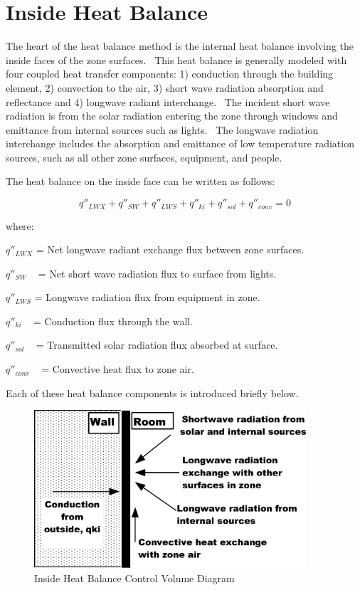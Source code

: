 \section{Inside Heat Balance}\label{inside-heat-balance}

The heart of the heat balance method is the internal heat balance involving the inside faces of the zone surfaces.~ This heat balance is generally modeled with four coupled heat transfer components: 1) conduction through the building element, 2) convection to the air, 3) short wave radiation absorption and reflectance and 4) longwave radiant interchange.~ The incident short wave radiation is from the solar radiation entering the zone through windows and emittance from internal sources such as lights.~ The longwave radiation interchange includes the absorption and emittance of low temperature radiation sources, such as all other zone surfaces, equipment, and people.

The heat balance on the inside face can be written as follows:

\begin{equation}
{q''_{LWX}} + {q''_{SW}} + {q''_{LWS}} + {q''_{ki}} + {q''_{sol}} + {q''_{conv}} = 0
\end{equation}

where:

\({q''_{LWX}}\) = Net longwave radiant exchange flux between zone surfaces.

\({q''_{SW}}\) ~ = Net short wave radiation flux to surface from lights.

\({q''_{LWS}}\) = Longwave radiation flux from equipment in zone.

\({q''_{ki}}\) ~ = Conduction flux through the wall.

\({q''_{sol}}\) ~ = Transmitted solar radiation flux absorbed at surface.

\({q''_{conv}}\) ~ = Convective heat flux to zone air.

Each of these heat balance components is introduced briefly below.

\begin{figure}[hbtp] %
\centering
\includegraphics[width=0.9\textwidth, height=0.9\textheight, keepaspectratio=true]{media/image301.png}
\caption{Inside Heat Balance Control Volume Diagram \protect \label{fig:inside-heat-balance-control-volume-diagram}}
\end{figure}

